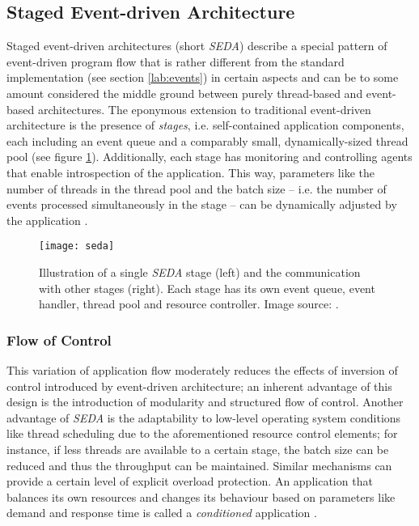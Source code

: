 \subsection{Staged Event-driven Architecture}
\label{sec:seda}
Staged event-driven architectures (short \textit{SEDA}) describe a special pattern of event-driven program flow that is rather different from the standard implementation (see section \ref{lab:events}) in certain aspects and can be to some amount considered the middle ground between purely thread-based and event-based architectures. The eponymous extension to traditional event-driven architecture is the presence of \textit{stages}, i.e. self-contained application components, each including an event queue and a comparably small, dynamically-sized thread pool (see figure \ref{fig:seda}). Additionally, each stage has monitoring and controlling agents that enable introspection of the application. This way, parameters like the number of threads in the thread pool and the batch size -- i.e. the number of events processed simultaneously in the stage -- can be dynamically adjusted by the application \cite{Welsh2001}. 

\begin{figure}
\centering\small
\setlength{\tabcolsep}{0mm}
  \texttt{[image: seda]}
\caption{
Illustration of a single \textit{SEDA} stage (left) and the communication with other stages (right). Each stage has its own event queue, event handler, thread pool and resource controller. Image source: \cite{Welsh2001}.
}
\label{fig:seda}
\end{figure}

\subsubsection*{Flow of Control}
This variation of application flow moderately reduces the effects of inversion of control introduced by event-driven architecture; an inherent advantage of this design is the introduction of modularity and structured flow of control. Another advantage of \textit{SEDA} is the adaptability to low-level operating system conditions like thread scheduling due to the aforementioned resource control elements; for instance, if less threads are available to a certain stage, the batch size can be reduced and thus the throughput can be maintained. Similar mechanisms can provide a certain level of explicit overload protection. An application that balances its own resources and changes its behaviour based on parameters like demand and response time is called a \textit{conditioned} application \cite{Welsh2001}. 


